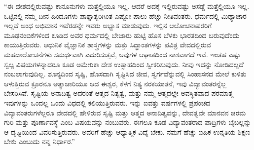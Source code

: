 “ಈ ದೇಶದಲ್ಲಿರುವಷ್ಟು ಕಾನೂನುಗಳು ಮತ್ತೆಲ್ಲಿಯೂ ಇಲ್ಲ. ಆದರೆ ಅದಕ್ಕೆ ಇಲ್ಲಿರುವಷ್ಟು ಅಸಡ್ಡೆ ಮತ್ತೆಲ್ಲಿಯೂ ಇಲ್ಲ. ಒಟ್ಟಿನಲ್ಲಿ ನಮ್ಮ ದೀನ ಹಿಂದೂಗಳು ಪಾಶ್ಚಾತ್ಯರಿಗಿಂತ ಎಷ್ಟೋ ಪಾಲು ಹೆಚ್ಚು ನೀತಿವಂತರು. ಧರ್ಮದಲ್ಲಿ ಮಿಥ್ಯಾಚಾರ ಇಲ್ಲವೆ ಅಂಧ ಅಭಿಮಾನ ಇವೆರಡನ್ನೇ ಇವರು ಅಭ್ಯಾಸ ಮಾಡುವುದು. ಇಲ್ಲಿನ ಆಲೋಚನಾಪರರಿಗೆ ಮೂಢನಂಬಿಕೆಗಳಿಂದ ಕೂಡಿದ ಅವರ ಧರ್ಮದಲ್ಲಿ ಬೇಜಾರು ಹುಟ್ಟಿ ಹೊಸ ಬೆಳಕು ಭಾರತದಿಂದ ಬರುವುದೆಂದು ಕಾಯುತ್ತಿರುವರು. ಆಧುನಿಕ ವೈಜ್ಞಾನಿಕ ಶಾಸ್ತ್ರಗಳನ್ನು ಮತ್ತು ಸಿದ್ಧಾಂತಗಳನ್ನು ಪವಿತ್ರ ವೇದದಲ್ಲಿರುವ ಮಹದಾಲೋಚನೆಗಳು ಸಮರ್ಥವಾಗಿ ಎದುರಿಸುತ್ತವೆ, ಅವುಗಳ ಆಘಾತದಿಂದ ನಾಶವಾಗದೆ ಇವೆ. ಇಂತಹ ಎಷ್ಟು ಸ್ವಲ್ಪ ವಿಷಯಗಳನ್ನಾದರೂ ಕೂಡ ಅಮೇರಿಕಾ ದೇಶ ಉತ್ಸಾಹದಿಂದ ಸ್ವೀಕರಿಸುವುದು. ನೀವು ಇದನ್ನು ನೋಡಿದಲ್ಲದೆ ನಂಬಲಾಗುವುದಿಲ್ಲ. ಶೂನ್ಯದಿಂದ ಸೃಷ್ಟಿ, ಹೊಸದಾಗಿ ಸೃಷ್ಟಿಸಿದ ಜೀವ, ಸ್ವರ್ಗವೆನ್ನುವಲ್ಲಿ ಸಿಂಹಾಸನದ ಮೇಲೆ ಕುಳಿತು ಆಳುತ್ತಿರುವ ಕ್ರೂರನೂ ಅತ್ಯಾಚಾರಿಯೂ ಆದ ಈಶ್ವರ, ಕೆಳಗೆ ನಿತ್ಯ ನರಕಯಾತನೆ, ಇವು ವಿದ್ಯಾವಂತರನ್ನೆಲ್ಲ ಬೇಸರಿಸಿವೆ. ಸೃಷ್ಟಿಯ ಅನಾದಿತ್ವ ಅದರಂತೆ ಆತ್ಮದ ನಿತ್ಯತ್ವ, ಮತ್ತು ನಮ್ಮ ಆತ್ಮದಲ್ಲೇ ಅವಸ್ಥಿತವಾದ ಪರಮಾತ್ಮ ಇವುಗಳನ್ನು ಒಂದಲ್ಲ ಒಂದು ವಿಧದಲ್ಲಿ ಕಲಿಯುತ್ತಿರುವರು. ಇನ್ನು ಐವತ್ತು ವರ್ಷಗಳಲ್ಲಿ ಪ್ರಪಂಚದ ವಿದ್ಯಾವಂತರುಗಳೆಲ್ಲರೂ ವೇದದಲ್ಲಿ ಹೇಳಿರುವ ಸೃಷ್ಟಿ ಮತ್ತು ಆತ್ಮದ ಅನಾದಿತ್ವವನ್ನು, ದೇವತ್ವವೇ ಮಾನವನ ಚರಮ ಗುರಿ ಮತ್ತು ಪೂರ್ಣಾವಸ್ಥೆ ಎಂಬ ವಿಷಯವನ್ನು ನಂಬುವರು. ಈಗಲೂ ಕೂಡ ವಿದ್ಯಾವಂತರಾದ ಪಾದ್ರಿಗಳು ಬೈಬಲ್ಲನ್ನು ಆ ದೃಷ್ಟಿಯಿಂದ ವಿವರಿಸುತ್ತಿರುವರು. ಅವರಿಗೆ ಹೆಚ್ಚು ಆಧ್ಯಾತ್ಮಿಕ ವಿದ್ಯೆ ಬೇಕು. ನಮಗೆ ಹೆಚ್ಚು ಐಹಿಕ ಉನ್ನತಿಯ ಶಿಕ್ಷಣ ಬೇಕು ಎಂಬುದು ನನ್ನ ನಿರ್ಧಾರ.” 

